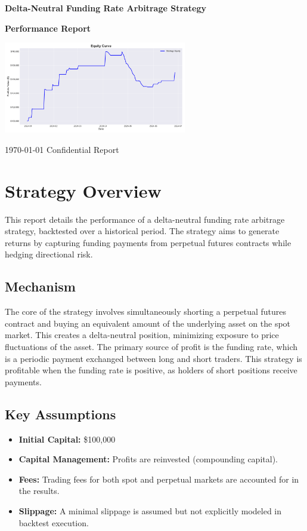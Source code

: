 \documentclass{article}
\begin{document}
\begin{titlepage}
    \centering
    \vspace*{2cm}
    {\Huge\bfseries\color{primary} Delta-Neutral Funding Rate Arbitrage Strategy}
    \vspace{1cm}
    
    {\Large\bfseries Performance Report}
    \vspace{2cm}
    
    \includegraphics[width=0.6\textwidth]{equity_curve.png}
    \vspace{1.5cm}
    
    {\large \today}
    \vfill
    {\large Confidential Report}
\end{titlepage}

\tableofcontents
\newpage

\section{Strategy Overview}
This report details the performance of a delta-neutral funding rate arbitrage strategy, backtested over a historical period. The strategy aims to generate returns by capturing funding payments from perpetual futures contracts while hedging directional risk.

\subsection{Mechanism}
The core of the strategy involves simultaneously shorting a perpetual futures contract and buying an equivalent amount of the underlying asset on the spot market. This creates a delta-neutral position, minimizing exposure to price fluctuations of the asset. The primary source of profit is the funding rate, which is a periodic payment exchanged between long and short traders. This strategy is profitable when the funding rate is positive, as holders of short positions receive payments.

\subsection{Key Assumptions}
\begin{itemize}
    \item \textbf{Initial Capital:} \$100,000
    \item \textbf{Capital Management:} Profits are reinvested (compounding capital).
    \item \textbf{Fees:} Trading fees for both spot and perpetual markets are accounted for in the results.
    \item \textbf{Slippage:} A minimal slippage is assumed but not explicitly modeled in backtest execution.
\end{itemize}
\end{document}
